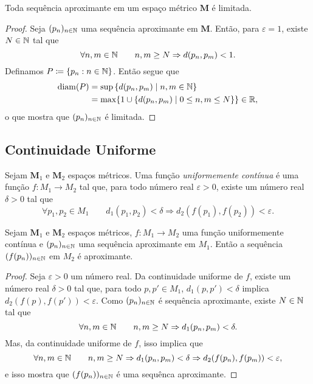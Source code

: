 \begin{prop}
Toda sequência aproximante em um espaço métrico $\bm M$ é limitada.
\end{prop}
\begin{proof}
Seja $(p_n)_{n \in \mathbb{N}}$ uma sequência aproximante em $\bm M$. Então, para $\varepsilon=1$, existe $N \in \mathbb{N}$ tal que
	\begin{equation*}
	\forall n,m \in \mathbb{N} \qquad n,m \geq N \Rightarrow d(p_n,p_m)<1.
	\end{equation*}
	Definamos $P \coloneqq \{p_n : n \in \mathbb{N}\}$. Então segue que
	\begin{align*}
	\operatorname{diam}(P) &= \sup \left\{d(p_n,p_m) \;\middle\vert\; n,m \in \mathbb{N} \right\} \\
		&= \max\{1 \cup \left\{d(p_n,p_m) \;\middle\vert\; 0 \leq n,m \leq N \right\}\} \in \mathbb{R},
	\end{align*}
o que mostra que $(p_n)_{n \in \mathbb{N}}$ é limitada.
\end{proof}

\subsection{Continuidade Uniforme}

\begin{defi}
Sejam $\bm M_1$ e $\bm M_2$ espaços métricos. Uma função \emph{uniformemente contínua} é uma função $f: M_1 \to M_2$ tal que, para todo número real $\varepsilon > 0$, existe um número real $\delta > 0$ tal que
	\begin{equation*}
	\forall p_1,p_2 \in M_1 \qquad d_1(p_1,p_2) < \delta \Rightarrow d_2(f(p_1),f(p_2)) < \varepsilon.
	\end{equation*}
\end{defi}

\begin{prop}
Sejam $\bm M_1$ e $\bm M_2$ espaços métricos, $f: M_1 \to M_2$ uma função uniformemente contínua e $(p_n)_{n \in \mathbb{N}}$ uma sequência aproximante em $M_1$. Então a sequência $(f(p_n))_{n \in \mathbb{N}}$ em $M_2$ é aproximante.
\end{prop}
\begin{proof}
Seja $\varepsilon > 0$ um número real. Da continuidade uniforme de $f$, existe um número real $\delta > 0$ tal que, para todo $p,p' \in M_1$, $d_1(p,p') < \delta$ implica $d_2(f(p),f(p')) < \varepsilon$. Como $(p_n)_{n \in \mathbb{N}}$ é sequência aproximante, existe $N \in \mathbb{N}$ tal que
	\begin{equation*}
	\forall n,m \in \mathbb{N} \qquad n,m \geq N \Rightarrow d_1(p_n,p_m) < \delta.
	\end{equation*}
Mas, da continuidade uniforme de $f$, isso implica que
	\begin{equation*}
	\forall n,m \in \mathbb{N} \qquad n,m \geq N \Rightarrow d_1(p_n,p_m) < \delta  \Rightarrow d_2(f(p_n),f(p_m)) < \varepsilon,
	\end{equation*}
e isso mostra que $(f(p_n))_{n \in \mathbb{N}}$ é uma sequênca aproximante.
\end{proof}

